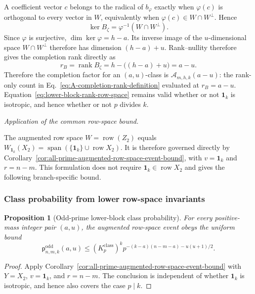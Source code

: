 \documentclass[11pt]{article}
\newcommand{\rank}{\operatorname{rank}}
\newcommand{\1}{\mathbf 1}
\theoremstyle{plain}
\newtheorem{proposition}[theorem]{Proposition}
\theoremstyle{definition}
\theoremstyle{remark}
\begin{document}
A coefficient vector $c$ belongs to the radical of $b_{\varphi}$ exactly when
$\varphi(c)$ is orthogonal to every vector in $W$, equivalently when
$\varphi(c)\in W\cap W^\perp$.  Hence
\begin{equation}
 \ker B_{\zeta}
 =\varphi^{-1}(W\cap W^\perp).
 \label{eq:unreported-Gram-kernel-preimage}
\end{equation}
Since $\varphi$ is surjective, $\dim\ker\varphi=h-a$.  Its inverse image of the
$u$-dimensional space $W\cap W^\perp$ therefore has dimension
$(h-a)+u$.  Rank--nullity therefore gives
the completion rank directly as
\begin{equation}
 r_B=\rank B_{\zeta}
 =h-\bigl((h-a)+u\bigr)=a-u.
 \label{eq:lower-block-rank-row-space}
\end{equation}
Therefore the completion factor for an $(a,u)$-class is
$\mathcal A_{m,h,k}(a-u)$: the rank-only count in
Eq.~\eqref{eq:A-completion-rank-definition} evaluated at
$r_B=a-u$.  Equation~\eqref{eq:lower-block-rank-row-space} remains
valid whether or not $\1_k$ is isotropic, and hence whether or not $p$ divides
$k$.

\medskip\noindent\emph{Application of the common row-space bound.}\par
The augmented row space $W=\operatorname{row}(Z_2)$ equals
$W_{\1_k}(X_2)=\operatorname{span}(\{\1_k\}\cup\operatorname{row}X_2)$.
It is therefore governed directly by
Corollary~\ref{cor:all-prime-augmented-row-space-event-bound}, with
$v=\1_k$ and $r=n-m$.  This formulation does not require
$\1_k\in\operatorname{row}X_2$ and gives the following branch-specific
bound.

\subsubsection{Class probability from lower row-space invariants}
\label{subsubsec:odd-lower-class-probability}

\begin{proposition}[Odd-prime lower-block class probability]
\label{prop:lower-block-class-probability}
For every positive-mass integer pair $(a,u)$, the augmented row-space event
obeys the uniform bound
\begin{equation}
 \mathsf p_{n,m,k}^{\mathrm{odd}}(a,u)
 \le
 (K_p^{\mathrm{class}})^k
 p^{-(k-a)(n-m-a)-u(u+1)/2}.
 \label{eq:lower-block-class-probability}
\end{equation}
\end{proposition}
\begin{proof}
Apply Corollary~\ref{cor:all-prime-augmented-row-space-event-bound} with
$Y=X_2$, $v=\1_k$, and $r=n-m$.  The conclusion is independent of whether
$\1_k$ is isotropic, and hence also covers the case $p\mid k$.
\end{proof}
\end{document}

